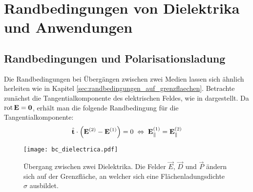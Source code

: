 \section{Randbedingungen von Dielektrika und Anwendungen\label{sec:randbedingungen_von_dielektrika}}



\subsection{Randbedingungen und Polarisationsladung}

Die Randbedingungen bei Übergängen zwischen zwei Medien lassen sich ähnlich herleiten wie in Kapitel \ref{sec:randbedingungen_auf_grenzflaechen}. Betrachte zunächst die Tangentialkomponente des elektrischen Feldes, wie in  dargestellt. Da $\operatorname{rot} \mathbf{E}=\mathbf{0}$, erhält man die folgende Randbedingung für die Tangentialkomponente:
\begin{equation*}
	\hat{\mathbf{t}}\cdot \left(\mathbf{E}^{\left(2\right)}-\mathbf{E}^{\left(1\right)}\right)=0\;\Leftrightarrow\; \mathbf{E}_{\parallel }^{\left(1\right)}=\mathbf{E}_{\parallel }^{\left(2\right)}
\end{equation*}


\begin{figure}[htb]
	\centering
	\texttt{[image: bc\_dielectrica.pdf]}
	\caption{Übergang zwischen zwei Dielektrika. Die Felder $\vec E$, $\vec D$ und $\vec P$ ändern sich auf der Grenzfläche, an welcher sich eine Flächenladungsdichte $\sigma$ ausbildet. }
	\label{fig:bc_dielectrica}
\end{figure}

